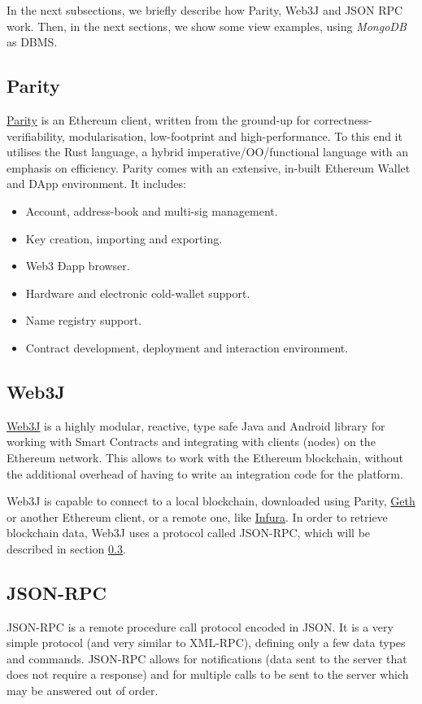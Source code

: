In the next subsections, we briefly describe how Parity, Web3J and JSON RPC work. Then, in the next sections, we show some view examples, using \textit{MongoDB} as DBMS.

\subsection{Parity}
\label{parity}
\href{https://www.parity.io/}{Parity} \cite{authors2017ethereum} is an Ethereum client, written from the ground-up for correctness-verifiability, modularisation, low-footprint and high-performance. \newline
To this end it utilises the Rust language, a hybrid imperative/OO/functional language with an emphasis on efficiency. 
\newline
Parity comes with an extensive, in-built Ethereum Wallet and DApp environment. It includes:
\begin{itemize}
    \item Account, address-book and multi-sig management.
    \item Key creation, importing and exporting.
    \item Web3 Ðapp browser.
    \item Hardware and electronic cold-wallet support.
    \item Name registry support.
    \item Contract development, deployment and interaction environment.
\end{itemize}

\subsection{Web3J}
\label{web3j}
\href{https://web3j.io/}{Web3J} is a highly modular, reactive, type safe Java and Android library for working with Smart Contracts and integrating with clients (nodes) on the Ethereum network. This allows to work with the Ethereum blockchain, without the additional overhead of having to write an integration code for the platform.

Web3J is capable to connect to a local blockchain, downloaded using Parity, \href{https://github.com/ethereum/go-ethereum/wiki/geth}{Geth} or another Ethereum client, or a remote one, like \href{https://infura.io}{Infura}.
In order to retrieve blockchain data, Web3J uses a protocol called JSON-RPC, which will be described in section \ref{jsonrpc}. 

\subsection{JSON-RPC}
\label{jsonrpc}
JSON-RPC \cite{json2012json} is a remote procedure call protocol encoded in JSON. It is a very simple protocol (and very similar to XML-RPC), defining only a few data types and commands. JSON-RPC allows for notifications (data sent to the server that does not require a response) and for multiple calls to be sent to the server which may be answered out of order.

